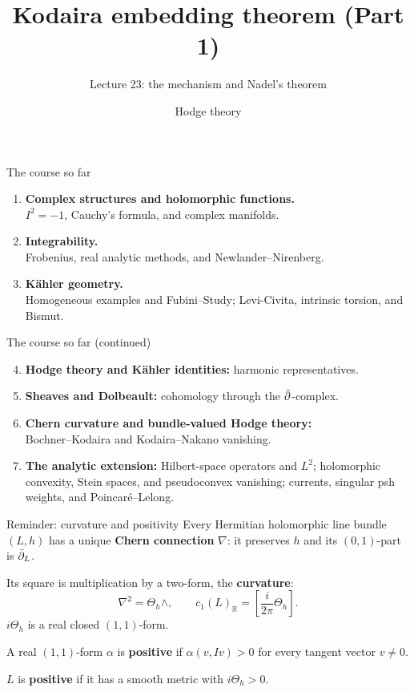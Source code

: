 
\title{Kodaira embedding theorem (Part 1)}
\subtitle{Lecture 23: the mechanism and Nadel's theorem}
\date{Hodge theory}

\begin{frame}\titlepage\end{frame}
\begin{frame}{The course so far}
\begin{enumerate}
\setlength{\itemsep}{12pt}
\item \textbf{Complex structures and holomorphic functions.}\\
\(I^2=-1\), Cauchy's formula, and complex manifolds.
\item \textbf{Integrability.}\\
Frobenius, real analytic methods, and Newlander--Nirenberg.
\item \textbf{Kähler geometry.}\\
Homogeneous examples and Fubini--Study; Levi-Civita, intrinsic torsion, and Bismut.
\end{enumerate}
\end{frame}

\begin{frame}{The course so far (continued)}
\begin{enumerate}
\setcounter{enumi}{3}
\setlength{\itemsep}{9pt}
\item \textbf{Hodge theory and Kähler identities:} harmonic representatives.
\item \textbf{Sheaves and Dolbeault:} cohomology through the \(\bar\partial\)-complex.
\item \textbf{Chern curvature and bundle-valued Hodge theory:}\\
Bochner--Kodaira and Kodaira--Nakano vanishing.
\item \textbf{The analytic extension:} Hilbert-space operators and \(L^2\);
holomorphic convexity, Stein spaces, and pseudoconvex vanishing;
currents, singular psh weights, and Poincaré--Lelong.
\end{enumerate}
\end{frame}

\begin{frame}{Reminder: curvature and positivity}
Every Hermitian holomorphic line bundle \((L,h)\) has a unique \textbf{Chern connection} \(\nabla\): it preserves \(h\) and its \((0,1)\)-part is \(\bar\partial_L\).
\par\medskip
Its square is multiplication by a two-form, the \textbf{curvature}:
\[
\nabla^2=\Theta_h\wedge,\qquad c_1(L)_{\mathbb R}=\left[\frac{i}{2\pi}\Theta_h\right].
\]
\(i\Theta_h\) is a real closed \((1,1)\)-form.
\par\medskip
A real \((1,1)\)-form \(\alpha\) is \textbf{positive} if \(\alpha(v,Iv)>0\) for every tangent vector \(v\ne0\).
\par\smallskip
\(L\) is \textbf{positive} if it has a smooth metric with \(i\Theta_h>0\).
\end{frame}

